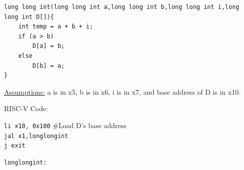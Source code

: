\documentclass[addpoints]{exam}
\begin{document}
\begin{sloppypar}
\begin{questions}
\begin{lstlisting}
long long int(long long int a,long long int b,long long int i,long long int D[]){
    int temp = a + b + i;
    if (a > b)
        D[a] = b;
    else
        D[b] = a;
}
\end{lstlisting}
    \begin{solution}
        
        \underline{Assumptions:} a is in x5, b is in x6, i is in x7, and base address of D is in x10. 

        RISC-V Code:

        \hspace*{1mm} \texttt{li x10, 0x100} \hspace*{5mm} \#Load D's base address \\ 
        \hspace*{1mm} \texttt{jal x1,long\underline{\hspace*{2mm}}long\underline{\hspace*{2mm}}int } \\ 
        \hspace*{1mm} \texttt{j exit}

        \hspace*{1mm} \texttt{long\underline{\hspace*{2mm}}long\underline{\hspace*{2mm}}int:}


\end{solution}
\end{questions}
\end{sloppypar}
\end{document}
